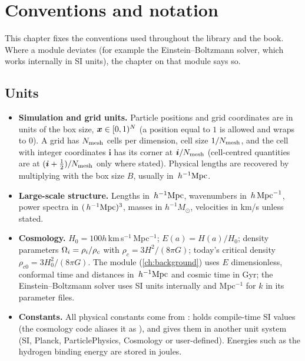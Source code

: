 \chapter{Conventions and notation}\label{ch:conventions}

This chapter fixes the conventions used throughout the library and the book. Where a module deviates (for example
the Einstein--Boltzmann solver, which works internally in SI units), the chapter on that module says so.

\section{Units}

\begin{itemize}
\item \textbf{Simulation and grid units.} Particle positions and grid coordinates are in units of the box size,
      $\bm{x}\in[0,1)^N$ (a position equal to $1$ is allowed and wraps to $0$). A grid has $N_{\rm mesh}$ cells per
      dimension, cell size $1/N_{\rm mesh}$, and the cell with integer coordinates $\bm i$ has its corner at
      $\bm i/N_{\rm mesh}$ (cell-centred quantities are at $(\bm i+\tfrac12)/N_{\rm mesh}$ only where stated).
      Physical lengths are recovered by multiplying with the box size $B$, usually in $\,h^{-1}\mathrm{Mpc}$.
\item \textbf{Large-scale structure.} Lengths in $\,h^{-1}\mathrm{Mpc}$, wavenumbers in $\,h\,\mathrm{Mpc}^{-1}$, power spectra in $(\,h^{-1}\mathrm{Mpc})^3$,
      masses in $h^{-1}M_\odot$, velocities in km/s unless stated.
\item \textbf{Cosmology.} $H_0=100h$\,km\,s$^{-1}$\,Mpc$^{-1}$; $E(a)=H(a)/H_0$; density parameters
      $\Omega_i=\rho_i/\rho_{c}$ with $\rho_c=3H^2/(8\pi G)$; today's critical density $\rho_{c0}=3H_0^2/(8\pi G)$.
      The  module (\cref{ch:background}) uses $E$ dimensionless, conformal time and distances in
      $\,h^{-1}\mathrm{Mpc}$ and cosmic time in Gyr; the Einstein--Boltzmann solver uses SI units internally and Mpc$^{-1}$ for $k$
      in its parameter files.
\item \textbf{Constants.} All physical constants come from :  holds
      compile-time SI values (the cosmology code aliases it as ), and
       gives them in another unit system (SI, Planck, ParticlePhysics, Cosmology or
      user-defined). Energies such as the hydrogen binding energy  are stored in joules.
\end{itemize}

